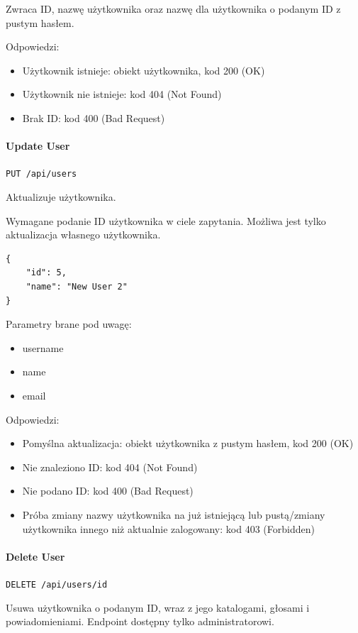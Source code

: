 \documentclass[a4paper,twoside,12pt]{book}
\begin{document}
Zwraca ID, nazwę użytkownika oraz nazwę dla użytkownika o podanym ID z pustym hasłem.

Odpowiedzi: 
\begin{itemize}
	\item Użytkownik istnieje: obiekt użytkownika, kod 200 (OK)
	\item Użytkownik nie istnieje: kod 404 (Not Found) 
	\item Brak ID: kod 400 (Bad Request) 
\end{itemize}

\paragraph{Update User}

\texttt{PUT /api/users}

Aktualizuje użytkownika.

Wymagane podanie ID użytkownika w ciele zapytania. Możliwa jest tylko aktualizacja własnego użytkownika.

\begin{verbatim}
{
    "id": 5,
    "name": "New User 2"
}
\end{verbatim}

Parametry brane pod uwagę: 
\begin{itemize}
	\item  username \item  name \item  email
\end{itemize}

Odpowiedzi: 
\begin{itemize}
	\item Pomyślna aktualizacja: obiekt użytkownika z pustym hasłem, kod 200 (OK) 
	\item Nie znaleziono ID: kod 404 (Not Found) 
	\item Nie podano ID: kod 400 (Bad Request)
	\item Próba zmiany nazwy użytkownika na już istniejącą lub pustą/zmiany użytkownika innego niż aktualnie zalogowany: kod 403 (Forbidden)
\end{itemize}

\paragraph{Delete User}

\texttt{DELETE /api/users/{id}}

Usuwa użytkownika o podanym ID, wraz z jego katalogami, głosami i powiadomieniami. Endpoint dostępny tylko administratorowi.
\end{document}
